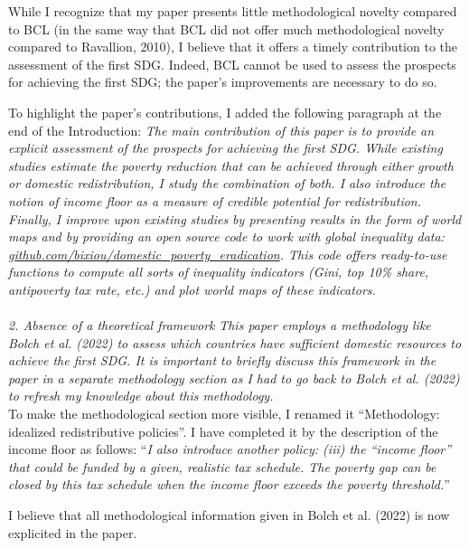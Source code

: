 \documentclass[12pt,english]{article}
\begin{document}
While I recognize that my paper presents little methodological novelty compared to BCL (in the same way that BCL did not offer much methodological novelty compared to Ravallion, 2010), I believe that it offers a timely contribution to the assessment of the first SDG. Indeed, BCL cannot be used to assess the prospects for achieving the first SDG; the paper's improvements are necessary to do so. 

To highlight the paper's contributions, I added the following paragraph at the end of the Introduction: \textit{The main contribution of this paper is to provide an explicit assessment of the prospects for achieving the first SDG. While existing studies estimate the poverty reduction that can be achieved through either growth or domestic redistribution, I study the combination of both. I also introduce the notion of \textit{income floor} as a measure of credible potential for redistribution. Finally, I improve upon existing studies by presenting results in the form of world maps and by providing an open source code to work with global inequality data: \href{https://github.com/bixiou/domestic_poverty_eradication}{github.com/bixiou/domestic\_poverty\_eradication}. This code offers ready-to-use functions to compute all sorts of inequality indicators (Gini, top 10\% share, antipoverty tax rate, etc.) and plot world maps of these indicators.}
~\\ ~\\

\textit{2.	Absence of a theoretical framework}
\textit{This paper employs a methodology like Bolch et al. (2022) to assess which countries have sufficient domestic resources to achieve the first SDG. It is important to briefly discuss this framework in the paper in a separate methodology section as I had to go back to Bolch et al. (2022) to refresh my knowledge about this methodology. }~\\

To make the methodological section more visible, I renamed it ``Methodology: idealized redistributive policies''. I have completed it by the description of the income floor as follows: ``\textit{I also introduce another policy: (iii) the ``income floor'' that could be funded by a given, realistic tax schedule. The poverty gap can be closed by this tax schedule when the income floor exceeds the poverty threshold.}'' 

I believe that all methodological information given in Bolch et al. (2022) is now explicited in the paper.
~\\ ~\\
\end{document}
